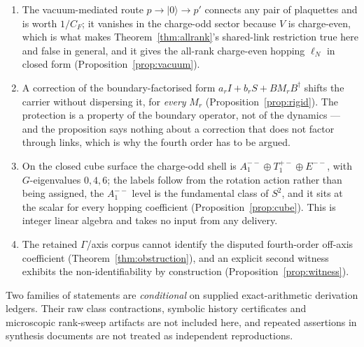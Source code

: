 \documentclass[10pt,twocolumn]{article}
\theoremstyle{plain}
\theoremstyle{definition}
\theoremstyle{remark}
\newcommand{\CF}{C_F}
\newcommand{\dg}{^{\dagger}}
\begin{document}
\begin{enumerate}
  status of $t_{r,+}$, and the $r=3$ one is conditional --- see
  item~\ref{item:domino}. That the charge-odd rest frame is blind to the hopping
  and the charge-even one is not follows from Schur's lemma alone: the
  charge-odd triple carries the irreducible $T_1$ and the charge-even one
  $A_1\oplus E$, so the two $\Gamma$ blocks have one level and two, at every
  order and independently of the incidence ansatz.
\item The vacuum-mediated route $p\to|0\rangle\to p'$ connects any pair of
  plaquettes and is worth $1/\CF$; it vanishes in the charge-odd sector because
  $V$ is charge-even, which is what makes Theorem~\ref{thm:allrank}'s
  shared-link restriction true here and false in general, and it gives the
  all-rank charge-even hopping $\ell_N$ in closed form
  (Proposition~\ref{prop:vacuum}).
\item A correction of the boundary-factorised form
  $a_rI+b_rS+BM_rB\dg$ shifts the carrier without dispersing it, for
  \emph{every} $M_r$ (Proposition~\ref{prop:rigid}). The protection is a
  property of the boundary operator, not of the dynamics --- and the
  proposition says nothing about a correction that does not factor through
  links, which is why the fourth order has to be argued.
\item On the closed cube surface the charge-odd shell is
  $A_1^{--}\oplus T_1^{+-}\oplus E^{--}$, with $G$-eigenvalues $0,4,6$; the
  labels follow from the rotation action rather than being assigned, the
  $A_1^{--}$ level is the fundamental class of $S^2$, and it sits at the scalar
  for every hopping coefficient (Proposition~\ref{prop:cube}). This is integer
  linear algebra and takes no input from any delivery.
\item The retained $\Gamma$/axis corpus cannot identify the disputed
  fourth-order off-axis coefficient (Theorem~\ref{thm:obstruction}), and an
  explicit second witness exhibits the non-identifiability by construction
  (Proposition~\ref{prop:witness}).
\end{enumerate}

Two families of statements are \emph{conditional} on supplied exact-arithmetic
derivation ledgers. Their raw class contractions, symbolic history
certificates and microscopic rank-sweep artifacts are not included here, and
repeated assertions in synthesis documents are not treated as independent
reproductions.
\end{document}
